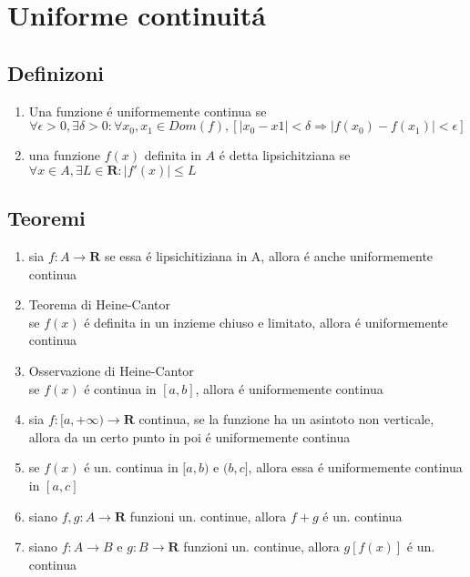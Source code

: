 \documentclass{exam}
\begin{document}
\section{Uniforme continuit\'a}
  \subsection{Definizoni}
    \begin{enumerate}
      \item
        Una funzione \'e uniformemente continua se
        \begin{equation}
         \forall \epsilon >0, \exists \delta >0 : \forall x_{0},x_{1} \in Dom(f),[|x_{0}-x{1}|<\delta \Rightarrow |f(x_{0})-f(x_{1})|<\epsilon]
        \end{equation}
      \item
       una funzione $f(x)$ definita in $A$ \'e detta lipsichitziana se $ \forall x\in A,\exists L\in \mathbf{R}:|f'(x)|\le L$
  \end{enumerate}


  \subsection{Teoremi}
    \begin{enumerate}
      \item
        sia $f:A\rightarrow \mathbf{R}$ se essa \'e lipsichitiziana in A, allora \'e anche uniformemente continua
      \item{Teorema di Heine-Cantor}\\
        se $f(x)$ \'e definita in un inzieme chiuso e limitato, allora \'e uniformemente continua
      \item{Osservazione di Heine-Cantor}\\
        se $f(x)$ \'e continua in $[a,b]$, allora \'e uniformemente continua
      \item
        sia $f:[a,+\infty)\rightarrow \mathbf{R}$ continua, se la funzione ha un asintoto non verticale, allora da un certo punto in poi \'e uniformemente continua
      \item
        se $f(x)$ \'e un. continua in $[a,b)$ e $(b,c]$, allora essa \'e uniformemente continua in $[a,c]$
      \item
        siano $f,g:A\rightarrow \mathbf{R}$ funzioni un. continue, allora $f+g$ \'e un. continua
      \item
        siano $f:A\rightarrow B$ e $g:B\rightarrow \mathbf{R}$ funzioni un. continue, allora $g[f(x)]$ \'e un. continua
    \end{enumerate}    
  \newpage
\end{document}
